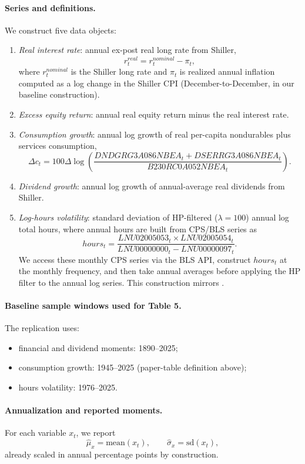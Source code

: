 \paragraph{Series and definitions.}
We construct five data objects:
\begin{enumerate}
\item \textit{Real interest rate}: annual ex-post real long rate from Shiller,
\[
r^{real}_t=r^{nominal}_t-\pi_t,
\]
where \(r^{nominal}_t\) is the Shiller long rate and \(\pi_t\) is realized annual inflation computed as a log change in the Shiller CPI (December-to-December, in our baseline construction).
\item \textit{Excess equity return}: annual real equity return minus the real interest rate.
\item \textit{Consumption growth}: annual log growth of real per-capita nondurables plus services consumption,
\[
\Delta c_t = 100\Delta \log\!\left(\frac{DNDGRG3A086NBEA_t+DSERRG3A086NBEA_t}{B230RC0A052NBEA_t}\right).
\]
\item \textit{Dividend growth}: annual log growth of annual-average real dividends from Shiller.
\item \textit{Log-hours volatility}: standard deviation of HP-filtered (\(\lambda=100\)) annual log total hours, where annual hours are built from CPS/BLS series as
\[
hours_t=\frac{LNU02005053_t \times LNU02005054_t}{LNU00000000_t-LNU00000097_t}.
\]
\noindent We access these monthly CPS series via the BLS API, construct \(hours_t\) at the monthly frequency, and then take annual averages before applying the HP filter to the annual log series. This construction mirrors \citet{rogerson2011search}.
\end{enumerate}

\paragraph{Baseline sample windows used for Table 5.}
The replication uses:
\begin{itemize}
\item financial and dividend moments: 1890--2025;
\item consumption growth: 1945--2025 (paper-table definition above);
\item hours volatility: 1976--2025.
\end{itemize}

\paragraph{Annualization and reported moments.}
For each variable \(x_t\), we report
\[
\widehat{\mu}_x = \text{mean}(x_t), \qquad
\widehat{\sigma}_x = \text{sd}(x_t),
\]
already scaled in annual percentage points by construction.

